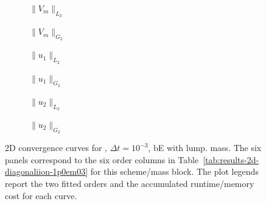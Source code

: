 \begin{figure}[p]
\centering
\begin{subfigure}{0.485\linewidth}
\centering
{}
\caption{$\|V_m\|_{L_2}$}
\label{fig:results-2d-diagonaliion-1p0em03-backwardeuler-lumped-a}
\end{subfigure}
\hfill
\begin{subfigure}{0.485\linewidth}
\centering
{}
\caption{$\|V_m\|_{G_2}$}
\label{fig:results-2d-diagonaliion-1p0em03-backwardeuler-lumped-b}
\end{subfigure}
\par\vspace{0.8em}
\begin{subfigure}{0.485\linewidth}
\centering
{}
\caption{$\|u_1\|_{L_2}$}
\label{fig:results-2d-diagonaliion-1p0em03-backwardeuler-lumped-c}
\end{subfigure}
\hfill
\begin{subfigure}{0.485\linewidth}
\centering
{}
\caption{$\|u_1\|_{G_2}$}
\label{fig:results-2d-diagonaliion-1p0em03-backwardeuler-lumped-d}
\end{subfigure}
\par\vspace{0.8em}
\begin{subfigure}{0.485\linewidth}
\centering
{}
\caption{$\|u_2\|_{L_2}$}
\label{fig:results-2d-diagonaliion-1p0em03-backwardeuler-lumped-e}
\end{subfigure}
\hfill
\begin{subfigure}{0.485\linewidth}
\centering
{}
\caption{$\|u_2\|_{G_2}$}
\label{fig:results-2d-diagonaliion-1p0em03-backwardeuler-lumped-f}
\end{subfigure}
\caption{2D convergence curves for , $\Delta t=10^{-3}$, bE with lump. mass. The six panels correspond to the six order columns in Table~\ref{tab:results-2d-diagonaliion-1p0em03} for this scheme/mass block. The plot legends report the two fitted orders and the accumulated runtime/memory cost for each curve.}
\label{fig:results-2d-diagonaliion-1p0em03-backwardeuler-lumped}
\end{figure}
\FloatBarrier

